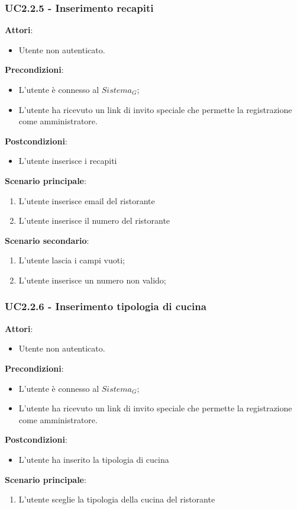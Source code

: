 \subsubsection{UC2.2.5 - Inserimento recapiti}\label{usecase:2_2_5}
\textbf{Attori}:
\begin{itemize}
    \item Utente non autenticato.
\end{itemize}
\textbf{Precondizioni}:
\begin{itemize}
    \item L'utente è connesso al $\textit{Sistema}_G$;
    \item L'utente ha ricevuto un link di invito speciale che permette la registrazione come amministratore.
\end{itemize}
\textbf{Postcondizioni}:
\begin{itemize}
    \item L'utente inserisce i recapiti
\end{itemize}
\textbf{Scenario principale}:
\begin{enumerate}
    \item L'utente inserisce email del ristorante
    \item L'utente inserisce il numero del ristorante
\end{enumerate}
\textbf{Scenario secondario}:
\begin{enumerate}
    \item L'utente lascia i campi vuoti;
    \item L'utente inserisce un numero non valido;
\end{enumerate}
\subsubsection{UC2.2.6 - Inserimento tipologia di cucina}\label{usecase:2_2_6}
\textbf{Attori}:
\begin{itemize}
    \item Utente non autenticato.
\end{itemize}
\textbf{Precondizioni}:
\begin{itemize}
    \item L'utente è connesso al $\textit{Sistema}_G$;
    \item L'utente ha ricevuto un link di invito speciale che permette la registrazione come amministratore.
\end{itemize}
\textbf{Postcondizioni}:
\begin{itemize}
    \item L'utente ha inserito la tipologia di cucina
\end{itemize}
\textbf{Scenario principale}:
\begin{enumerate}
    \item L'utente sceglie la tipologia della cucina del ristorante
\end{enumerate}
\newpage